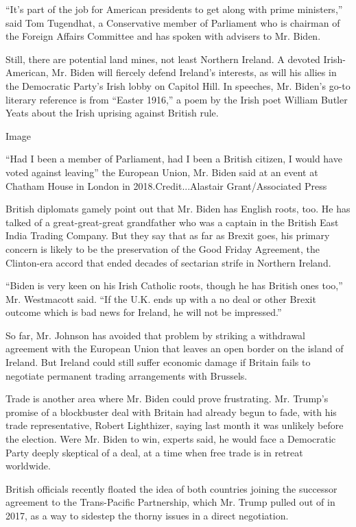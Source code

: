 ``It's part of the job for American presidents to get along with prime
ministers,'' said Tom Tugendhat, a Conservative member of Parliament who
is chairman of the Foreign Affairs Committee and has spoken with
advisers to Mr. Biden.

Still, there are potential land mines, not least Northern Ireland. A
devoted Irish-American, Mr. Biden will fiercely defend Ireland's
interests, as will his allies in the Democratic Party's Irish lobby on
Capitol Hill. In speeches, Mr. Biden's go-to literary reference is from
``Easter 1916,'' a poem by the Irish poet William Butler Yeats about the
Irish uprising against British rule.

Image

``Had I been a member of Parliament, had I been a British citizen, I
would have voted against leaving'' the European Union, Mr. Biden said at
an event at Chatham House in London in 2018.Credit...Alastair
Grant/Associated Press

British diplomats gamely point out that Mr. Biden has English roots,
too. He has talked of a great-great-great grandfather who was a captain
in the British East India Trading Company. But they say that as far as
Brexit goes, his primary concern is likely to be the preservation of the
Good Friday Agreement, the Clinton-era accord that ended decades of
sectarian strife in Northern Ireland.

``Biden is very keen on his Irish Catholic roots, though he has British
ones too,'' Mr. Westmacott said. ``If the U.K. ends up with a no deal or
other Brexit outcome which is bad news for Ireland, he will not be
impressed.''

So far, Mr. Johnson has avoided that problem by striking a withdrawal
agreement with the European Union that leaves an open border on the
island of Ireland. But Ireland could still suffer economic damage if
Britain fails to negotiate permanent trading arrangements with Brussels.

Trade is another area where Mr. Biden could prove frustrating. Mr.
Trump's promise of a blockbuster deal with Britain had already begun to
fade, with his trade representative, Robert Lighthizer, saying last
month it was unlikely before the election. Were Mr. Biden to win,
experts said, he would face a Democratic Party deeply skeptical of a
deal, at a time when free trade is in retreat worldwide.

British officials recently floated the idea of both countries joining
the successor agreement to the Trans-Pacific Partnership, which Mr.
Trump pulled out of in 2017, as a way to sidestep the thorny issues in a
direct negotiation.

